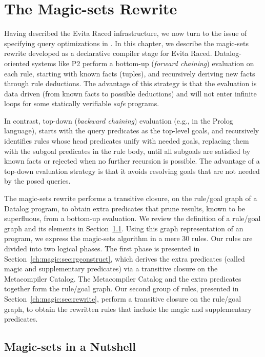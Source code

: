 \chapter[The Magic-sets Rewrite]{The Magic-sets Rewrite}
\label{ch:magic}

Having described the Evita Raced infrastructure, we now turn to the issue of
specifying query optimizations in \OVERLOG.  In this chapter, we describe the
magic-sets rewrite developed as a declarative compiler stage for Evita Raced.
Datalog-oriented systems like P2 perform a bottom-up (\emph{forward chaining})
evaluation on each rule, starting with known facts (tuples), and recursively
deriving new facts through rule deductions.  The advantage of this strategy is
that the evaluation is data driven (from known facts to possible deductions)
and will not enter infinite loops for some statically verifiable \emph{safe}
programs.

In contrast, top-down (\emph{backward chaining}) evaluation (e.g., in the
Prolog language), starts with the query predicates as the top-level goals, and
recursively identifies rules whose head predicates unify with needed goals,
replacing them with the subgoal predicates in the rule body, until all subgoals
are satisfied by known facts or rejected when no further recursion is possible.
The advantage of a top-down evaluation strategy is that it avoids resolving
goals that are not needed by the posed queries.

The magic-sets rewrite performs a transitive closure, on the rule/goal graph of
a Datalog program, to obtain extra predicates that prune results, known to be
superfluous, from a bottom-up evaluation.  We review the definition of a
rule/goal graph and its elements in Section~\ref{ch:magic:sec:review}.  Using
this graph representation of an \OVERLOG program, we express the magic-sets
algorithm in a mere $30$ rules.  Our rules are divided into two logical phases.
The first phase is presented in Section~\ref{ch:magic:sec:rgconstruct}, which
derives the extra predicates (called magic and supplementary predicates) via a
transitive closure on the Metacompiler Catalog.  The Metacompiler Catalog and
the extra predicates together form the rule/goal graph.  Our second group of
rules, presented in Section~\ref{ch:magic:sec:rewrite}, perform a transitive
closure on the rule/goal graph, to obtain the rewritten rules that include the
magic and supplementary predicates.

\section{Magic-sets in a Nutshell}
\label{ch:magic:sec:review}

